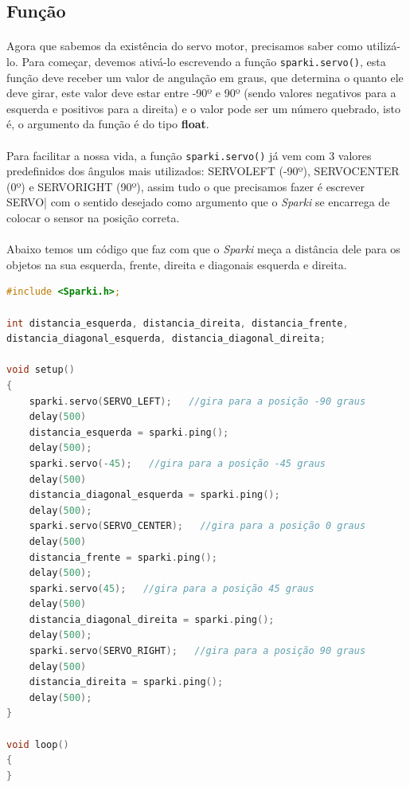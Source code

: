 \subsection{Função}

    \paragraph{}
    Agora que sabemos da existência do servo motor, precisamos saber como utilizá-lo. Para começar, devemos ativá-lo escrevendo a função \lstinline[columns=fixed]{sparki.servo()}, esta função deve receber um valor de angulação em graus, que determina o quanto ele deve girar, este valor deve estar entre -90º e 90º (sendo valores negativos para a esquerda e positivos para a direita) e o valor pode ser um número quebrado, isto é, o argumento da função é do tipo \textbf{float}.
    
    \paragraph{}
    Para facilitar a nossa vida, a função \lstinline[columns=fixed]{sparki.servo()} já vem com 3 valores predefinidos dos ângulos mais utilizados: SERVO\underline{\hspace{.1in}}LEFT (-90º),  SERVO\underline{\hspace{.1in}}CENTER (0º) e SERVO\underline{\hspace{.1in}}RIGHT (90º), assim tudo o que precisamos fazer é escrever SERVO\underline{\hspace{.1in}}| com o sentido desejado como argumento que o \textit{Sparki} se encarrega de colocar o sensor na posição correta.
    \\~\\
    Abaixo temos um código que faz com que o \textit{Sparki} meça a distância dele para os objetos na sua esquerda, frente, direita e diagonais esquerda e direita.

\begin{lstlisting}[language=C]
#include <Sparki.h>;

int distancia_esquerda, distancia_direita, distancia_frente,
distancia_diagonal_esquerda, distancia_diagonal_direita;

void setup()
{
    sparki.servo(SERVO_LEFT);   //gira para a posição -90 graus
    delay(500)
    distancia_esquerda = sparki.ping();  
    delay(500);
    sparki.servo(-45);   //gira para a posição -45 graus
    delay(500)
    distancia_diagonal_esquerda = sparki.ping();  
    delay(500);
    sparki.servo(SERVO_CENTER);   //gira para a posição 0 graus
    delay(500)
    distancia_frente = sparki.ping();  
    delay(500);
    sparki.servo(45);   //gira para a posição 45 graus
    delay(500)
    distancia_diagonal_direita = sparki.ping();  
    delay(500);
    sparki.servo(SERVO_RIGHT);   //gira para a posição 90 graus
    delay(500)
    distancia_direita = sparki.ping();  
    delay(500);
}

void loop()
{
}
\end{lstlisting}    
    

